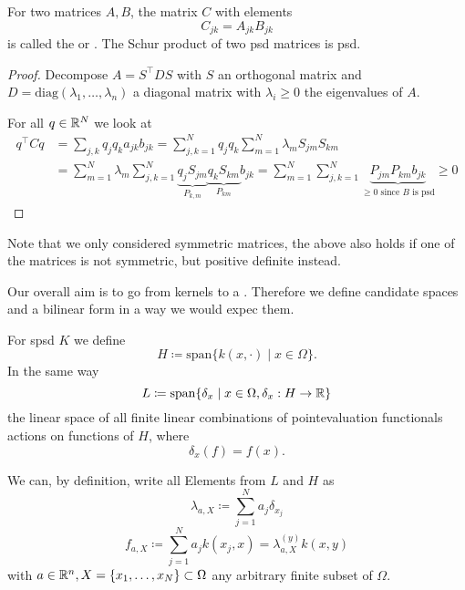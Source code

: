 \begin{lemma}\label{lemma:1.6}
    For two matrices $A,B$, the matrix $C$ with elements 
    \[C_{jk}=A_{jk}B_{jk}\]
    is called the  or . The Schur product of two 
    psd matrices is psd.
\end{lemma}

\begin{proof}
    Decompose $A=S^\intercal DS$ with $S$ an 
    orthogonal matrix and $D=\text{diag}(\lambda_1,\dots,\lambda_n)$ 
    a diagonal matrix with $\lambda_i\geq 0$ the eigenvalues of $A$.

    For all $q\in\mathbb{R}^N$ we look at 
    \begin{align*}
        q^\intercal Cq&=\sum_{j,k}q_jq_ka_{jk}b_{jk}=\sum_{j,k=1}^N q_j q_k\sum_{m=1}^N\lambda_m S_{jm}S_{km}\\
        &=\sum_{m=1}^N \lambda_m \sum_{j,k=1}^N \underbrace{q_j S_{jm}}_{P_{k,m}} \underbrace{q_k S_{km}}_{P_{km}} b_{jk}=\sum_{m=1}^N\sum_{j,k=1}^N\underbrace{P_{jm}P_{km}b_{jk}}_{\geq 0\text{ since } B \text{ is psd}}\geq 0
    \end{align*}
\end{proof}

\begin{remark}
    Note that we only considered symmetric matrices, the above also holds if one of the matrices is not symmetric, but positive definite instead. %
\end{remark}

\begin{remark}
    Our overall aim is to go from kernels to a . Therefore 
    we define candidate spaces and a bilinear form in a way we would expec them.
\end{remark}

\begin{*definition}
    For spsd $K$ we define 
    \[H\coloneqq\text{span}\{k(x,\cdot)\mid x\in\Omega\}.\]
    In the same way
    \[L\coloneqq \text{span}\{\delta_x\mid x\in\Omega,\delta_x:H\to\mathbb{R}\}\]
    the linear space of all finite linear combinations of pointevaluation functionals actions on functions of $H$, where \[\delta_x(f)=f(x).\]
\end{*definition}

We can, by definition, write all Elements from $L$ and $H$ as 
\[\lambda_{a,X}\coloneqq \sum_{j=1}^Na_j\delta_{x_j}\]
\[f_{a,X}\coloneqq \sum_{j=1}^Na_j k(x_j,x)=\lambda_{a,X}^{(y)}k(x,y)\]
with $a\in\mathbb{R}^n,X=\{x_1,\dots,x_N\}\subset\Omega$ any arbitrary finite subset of $\Omega$.

